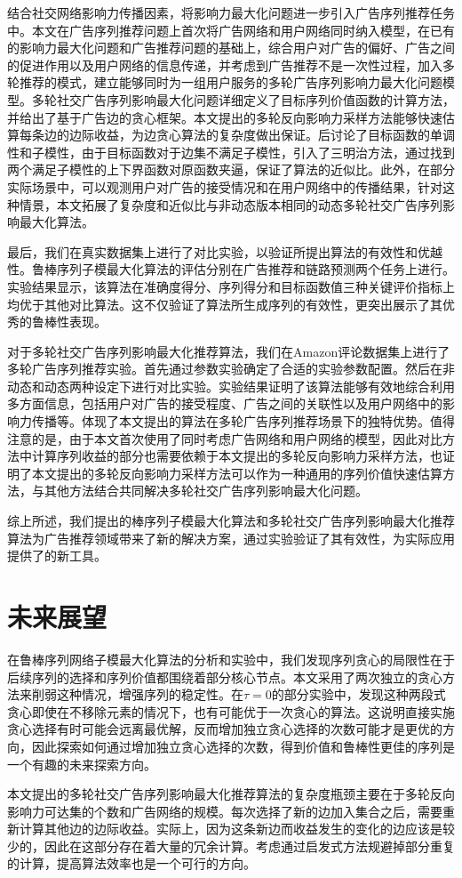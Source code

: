 结合社交网络影响力传播因素，将影响力最大化问题进一步引入广告序列推荐任务中。本文在广告序列推荐问题上首次将广告网络和用户网络同时纳入模型，在已有的影响力最大化问题和广告推荐问题的基础上，综合用户对广告的偏好、广告之间的促进作用以及用户网络的信息传递，并考虑到广告推荐不是一次性过程，加入多轮推荐的模式，建立能够同时为一组用户服务的多轮广告序列影响力最大化问题模型。多轮社交广告序列影响最大化问题详细定义了目标序列价值函数的计算方法，并给出了基于广告边的贪心框架。本文提出的多轮反向影响力采样方法能够快速估算每条边的边际收益，为边贪心算法的复杂度做出保证。后讨论了目标函数的单调性和子模性，由于目标函数对于边集不满足子模性，引入了三明治方法，通过找到两个满足子模性的上下界函数对原函数夹逼，保证了算法的近似比。此外，在部分实际场景中，可以观测用户对广告的接受情况和在用户网络中的传播结果，针对这种情景，本文拓展了复杂度和近似比与非动态版本相同的动态多轮社交广告序列影响最大化算法。

最后，我们在真实数据集上进行了对比实验，以验证所提出算法的有效性和优越性。鲁棒序列子模最大化算法的评估分别在广告推荐和链路预测两个任务上进行。实验结果显示，该算法在准确度得分、序列得分和目标函数值三种关键评价指标上均优于其他对比算法。这不仅验证了算法所生成序列的有效性，更突出展示了其优秀的鲁棒性表现。

对于多轮社交广告序列影响最大化推荐算法，我们在Amazon评论数据集上进行了多轮广告序列推荐实验。首先通过参数实验确定了合适的实验参数配置。然后在非动态和动态两种设定下进行对比实验。实验结果证明了该算法能够有效地综合利用多方面信息，包括用户对广告的接受程度、广告之间的关联性以及用户网络中的影响力传播等。体现了本文提出的算法在多轮广告序列推荐场景下的独特优势。值得注意的是，由于本文首次使用了同时考虑广告网络和用户网络的模型，因此对比方法中计算序列收益的部分也需要依赖于本文提出的多轮反向影响力采样方法，也证明了本文提出的多轮反向影响力采样方法可以作为一种通用的序列价值快速估算方法，与其他方法结合共同解决多轮社交广告序列影响最大化问题。

综上所述，我们提出的棒序列子模最大化算法和多轮社交广告序列影响最大化推荐算法为广告推荐领域带来了新的解决方案，通过实验验证了其有效性，为实际应用提供了的新工具。

\section{未来展望}

在鲁棒序列网络子模最大化算法的分析和实验中，我们发现序列贪心的局限性在于后续序列的选择和序列价值都围绕着部分核心节点。本文采用了两次独立的贪心方法来削弱这种情况，增强序列的稳定性。在$\tau=0$的部分实验中，发现这种两段式贪心即使在不移除元素的情况下，也有可能优于一次贪心的算法。这说明直接实施贪心选择有时可能会远离最优解，反而增加独立贪心选择的次数可能才是更优的方向，因此探索如何通过增加独立贪心选择的次数，得到价值和鲁棒性更佳的序列是一个有趣的未来探索方向。

本文提出的多轮社交广告序列影响最大化推荐算法的复杂度瓶颈主要在于多轮反向影响力可达集的个数和广告网络的规模。每次选择了新的边加入集合之后，需要重新计算其他边的边际收益。实际上，因为这条新边而收益发生的变化的边应该是较少的，因此在这部分存在着大量的冗余计算。考虑通过启发式方法规避掉部分重复的计算，提高算法效率也是一个可行的方向。